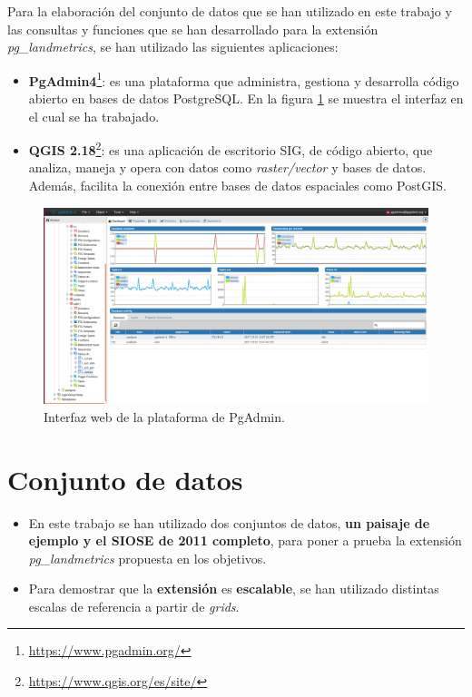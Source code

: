Para la elaboración del conjunto de datos que se han utilizado en este trabajo y las consultas y funciones que se han desarrollado para la extensión \textit{pg\_landmetrics}, se han utilizado las siguientes aplicaciones:

\begin{itemize}
\item\textbf{PgAdmin4}\footnote{\url{https://www.pgadmin.org/}}: es una plataforma que administra, gestiona y desarrolla código abierto en bases de datos PostgreSQL. En la figura \ref{fig:carga} se muestra el interfaz en el cual se ha trabajado.
\item\textbf{QGIS 2.18}\footnote{\url{https://www.qgis.org/es/site/}}: es una aplicación de escritorio SIG, de código abierto, que analiza, maneja y opera con datos como \textit{raster/vector} y bases de datos. Además, facilita la conexión entre bases de datos espaciales como PostGIS.
\end{itemize}

\begin{figure}
\begin{center}
\includegraphics[width=\textwidth]{Metodologia/Figs/carga-siose-2011.png}
\caption{Interfaz web de la plataforma de PgAdmin. \label{fig:carga}}
\end{center}
\end{figure}


\section{Conjunto de datos}

\begin{graybox}
\begin{itemize}
\item En este trabajo se han utilizado dos conjuntos de datos, \textbf{un paisaje de ejemplo y el SIOSE de 2011 completo}, para poner a prueba la extensión \textit{pg\_landmetrics} propuesta en los objetivos.
\item Para demostrar que la \textbf{extensión} es \textbf{escalable}, se han utilizado distintas escalas de referencia a partir de \textit{grids}.
\end{itemize}
\end{graybox}


